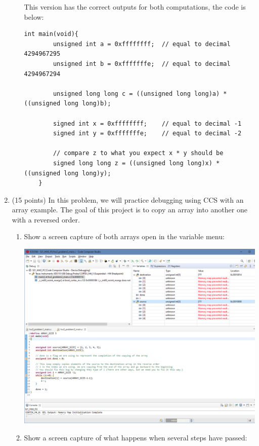 \documentclass{article}
\begin{document}
\begin{enumerate}
\begin{enumerate}
\begin{center}
            This version has the correct outputs for both computations, the code is below:
        \end{center}
        \lstset{language=C}
        \lstset{frame=lines}
        \lstset{basicstyle=\footnotesize}
        \begin{lstlisting}
int main(void){
        unsigned int a = 0xffffffff;  // equal to decimal 4294967295
        unsigned int b = 0xfffffffe;  // equal to decimal 4294967294
    
        unsigned long long c = ((unsigned long long)a) * ((unsigned long long)b); 
    
        signed int x = 0xffffffff;    // equal to decimal -1
        signed int y = 0xfffffffe;    // equal to decimal -2
    
        // compare z to what you expect x * y should be
        signed long long z = ((unsigned long long)x) * ((unsigned long long)y); 
    }
        \end{lstlisting}
    \end{enumerate}
    \newpage
    \item (15 points) In this problem, we will practice debugging using CCS with an array example. The goal of this project is to copy an array into another one with a reversed order.
    \begin{enumerate}
        \addtocounter{enumii}{3}
        \item Show a screen capture of both arrays open in the variable menu:
        
        \includegraphics[width = .9\textwidth]{2d.png}
        \newpage
        \item Show a screen capture of what happens when several steps have passed:
        

\end{enumerate}
\end{enumerate}
\end{document}
